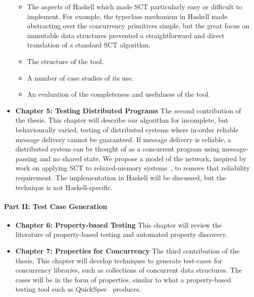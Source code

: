 \documentclass{article}
\begin{document}
\begin{itemize}
  \begin{itemize}
  \item The aspects of Haskell which made SCT particularly easy or
    difficult to implement. For example, the typeclass mechanism in
    Haskell made abstracting over the concurrency primitives simple,
    but the great focus on immutable data structures prevented a
    straightforward and direct translation of a standard SCT
    algorithm.
  \item The structure of the tool.
  \item A number of case studies of its use.
  \item An evaluation of the completeness and usefulness of the tool.
  \end{itemize}

\item \textbf{Chapter 5: Testing Distributed Programs} The second
  contribution of the thesis. This chapter will describe our algorithm
  for incomplete, but behaviourally varied, testing of distributed
  systems where in-order reliable message delivery cannot be
  guaranteed. If message delivery is reliable, a distributed system
  can be thought of as a concurrent program using message-passing and
  no shared state. We propose a model of the network, inspired by work
  on applying SCT to relaxed-memory systems~\cite{zhang2015}, to
  remove that reliability requirement. The implementation in Haskell
  will be discussed, but the technique is not Haskell-specific.
\end{itemize}

\paragraph{Part II: Test Case Generation}
\begin{itemize}
\item \textbf{Chapter 6: Property-based Testing} This chapter will
  review the literature of property-based testing and automated
  property discovery.

\item \textbf{Chapter 7: Properties for Concurrency} The third
  contribution of the thesis. This chapter will develop techniques to
  generate test-cases for concurrency libraries, such as collections
  of concurrent data structures. The cases will be in the form of
  properties, similar to what a property-based testing tool such as
  QuickSpec~\cite{claessen2010} produces.
\end{itemize}
\end{document}
